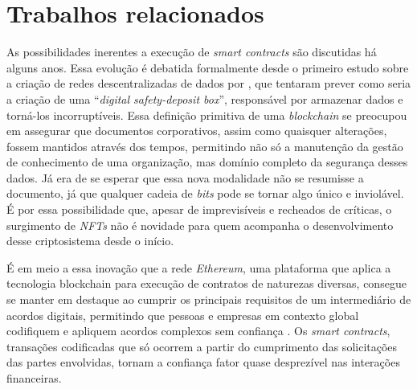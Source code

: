 {%

\section{\esp Trabalhos relacionados}

As possibilidades inerentes a execução de \textit{smart contracts} são discutidas há alguns anos. Essa evolução é debatida formalmente desde o primeiro estudo sobre a criação de redes descentralizadas de dados por , que tentaram prever como seria a criação de uma “\textit{digital safety-deposit box}”, responsável por armazenar dados e torná-los incorruptíveis. Essa definição primitiva de uma \textit{blockchain} se preocupou em assegurar que documentos corporativos, assim como quaisquer alterações, fossem mantidos através dos tempos, permitindo não só a manutenção da gestão de conhecimento de uma organização, mas domínio completo da segurança desses dados. 
Já era de se esperar que essa nova modalidade não se resumisse a documento, já que qualquer cadeia de \textit{bits} pode se tornar algo único e inviolável. É por essa possibilidade que, apesar de imprevisíveis e recheados de críticas, o surgimento de \textit{NFTs} não é novidade para quem acompanha o desenvolvimento desse criptosistema desde o início.

É em meio a essa inovação que a rede \textit{Ethereum}, uma plataforma que aplica a tecnologia blockchain para execução de contratos de naturezas diversas, consegue se manter em destaque ao cumprir os principais requisitos de um intermediário de acordos digitais, permitindo que pessoas e empresas em contexto global codifiquem e apliquem acordos complexos sem confiança \cite{tikhomirov2018smartcheck}. Os \textit{smart contracts}, transações codificadas que só ocorrem a partir do cumprimento das solicitações das partes envolvidas, tornam a confiança fator quase desprezível nas interações financeiras.

}
